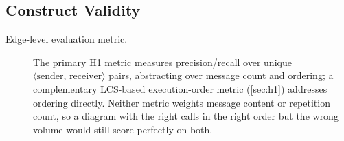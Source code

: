 \subsection{Construct Validity}

\begin{description}
  \item[Edge-level evaluation metric.] The primary H1 metric measures
    precision/recall over unique $\langle\text{sender},\,
    \text{receiver}\rangle$ pairs, abstracting over message count and
    ordering; a complementary LCS-based execution-order metric
    (\cref{sec:h1}) addresses ordering directly. Neither metric weights
    message content or repetition count, so a diagram with the right
    calls in the right order but the wrong volume would still score
    perfectly on both.
\end{description}

